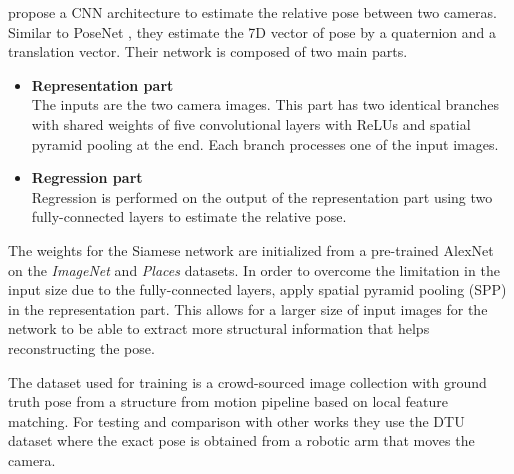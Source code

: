 		\cite{melekhov2017poseCNN} propose a CNN architecture to estimate the relative pose between two cameras.
		Similar to PoseNet \cite{kendall2015posenet}, they estimate the 7D vector of pose by a quaternion and a translation vector.
		Their network is composed of two main parts.
		\begin{itemize}
			\item \textbf{Representation part}
				\\
				The inputs are the two camera images. 
				This part has two identical branches with shared weights of five convolutional layers with ReLUs and spatial pyramid pooling at the end.
				Each branch processes one of the input images.
			\item \textbf{Regression part}
				\\
				Regression is performed on the output of the representation part using two fully-connected layers to estimate the relative pose.
		\end{itemize}
		The weights for the Siamese network are initialized from a pre-trained AlexNet on the \emph{ImageNet} and \emph{Places} datasets.
		In order to overcome the limitation in the input size due to the fully-connected layers, \cite{melekhov2017poseCNN} apply spatial pyramid pooling (SPP) in the representation part.
		This allows for a larger size of input images for the network to be able to extract more structural information that helps reconstructing the pose.
		
		The dataset used for training is a crowd-sourced image collection with ground truth pose from a structure from motion pipeline based on local feature matching.
		For testing and comparison with other works they use the {DTU} dataset where the exact pose is obtained from a robotic arm that moves the camera.
		
		
		
		
		
		